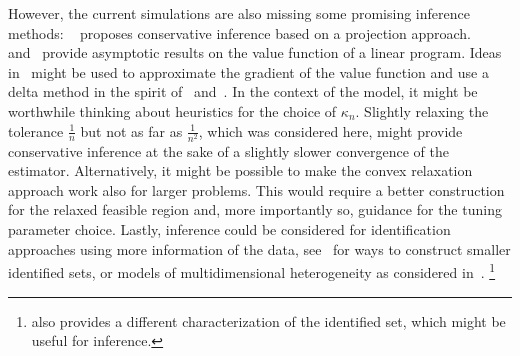 \documentclass[12pt,a4paper,english]{article} %
\numberwithin{equation}{section}
\theoremstyle{definition}
\theoremstyle{remark}
\theoremstyle{plain}
\begin{document}
However, the current simulations are also missing some promising inference methods:
~\cite{bei2023inference} proposes conservative inference based on a projection approach.~\cite{bhattacharya2009inferring} and~\cite{freyberger2015identification} provide asymptotic results on the value function of a linear program.
Ideas in~\cite{de_wolf_smeers2021generalized} might be used to approximate the gradient of the value function and use a delta method in the spirit of~\cite{shapiro1991asymptotic} and~\cite{fang2019infdirdiff}.
In the context of the model, it might be worthwhile thinking about heuristics for the choice of $\kappa_n$.
Slightly relaxing the tolerance $\frac{1}{n}$ but not as far as $\frac{1}{n^2}$, which was considered here, might provide conservative inference at the sake of a slightly slower convergence of the estimator.
Alternatively, it might be possible to make the convex relaxation approach work also for larger problems.
This would require a better construction for the relaxed feasible region and, more importantly so, guidance for the tuning parameter choice.
Lastly, inference could be considered for identification approaches using more information of the data, see~\cite{marx2024sharp} for ways to construct smaller identified sets, or models of multidimensional heterogeneity as considered in~\cite{dutz2021selection}.
\footnote{\cite{marx2024sharp} also provides a different characterization of the identified set, which might be useful for inference.}

\clearpage
\newpage





\clearpage
\newpage


\appendix
{}
\end{document}
